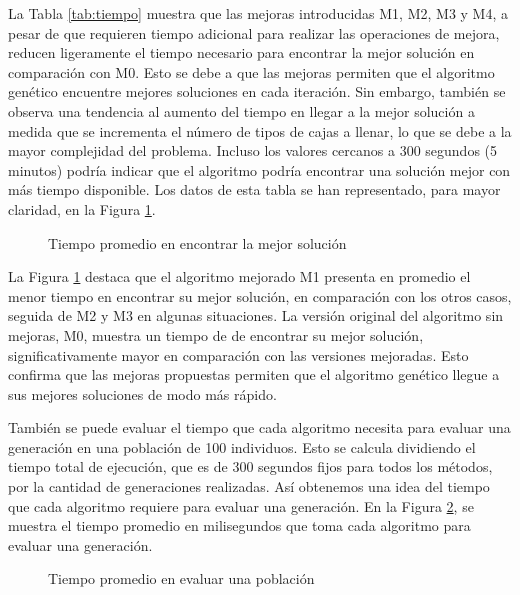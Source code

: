 \documentclass[openany]{article}
\begin{document}
La Tabla \ref{tab:tiempo} muestra que las mejoras introducidas M1, M2, M3 y M4, a pesar de que requieren tiempo adicional para realizar las operaciones de mejora, reducen ligeramente el tiempo necesario para encontrar la mejor solución en comparación con M0. Esto se debe a que las mejoras permiten que el algoritmo genético encuentre mejores soluciones en cada iteración. Sin embargo, también se observa una tendencia al aumento del tiempo en llegar a la mejor solución a medida que se incrementa el número de tipos de cajas a llenar, lo que se debe a la mayor complejidad del problema. Incluso los valores cercanos a 300 segundos (5 minutos) podría indicar que el algoritmo podría encontrar una solución mejor con más tiempo disponible. Los datos de esta tabla se han representado, para mayor claridad, en la Figura \ref{fig:tiempos}.

\begin{figure}[H]
    \centering
    
    \caption{Tiempo promedio en encontrar la mejor solución}
    \label{fig:tiempos}
\end{figure}

La Figura \ref{fig:tiempos} destaca que el algoritmo mejorado M1 presenta en promedio el menor tiempo en encontrar su mejor solución, en comparación con los otros casos, seguida de M2 y M3 en algunas situaciones. La versión original del algoritmo sin mejoras, M0, muestra un tiempo de de encontrar su mejor solución, significativamente mayor en comparación con las versiones mejoradas. Esto confirma que las mejoras propuestas permiten que el algoritmo genético llegue a sus mejores soluciones de modo más rápido.

También se puede evaluar el tiempo que cada algoritmo necesita para evaluar una generación en una población de 100 individuos. Esto se calcula dividiendo el tiempo total de ejecución, que es de 300 segundos fijos para todos los métodos, por la cantidad de generaciones realizadas. Así obtenemos una idea del tiempo que cada algoritmo requiere para evaluar una generación. En la Figura \ref{fig:tiempo_generacion}, se muestra el tiempo promedio en milisegundos que toma cada algoritmo para evaluar una generación.

\begin{figure}[H]
    \centering
    
    \caption{Tiempo promedio en evaluar una población}
    \label{fig:tiempo_generacion}
\end{figure}
\end{document}
